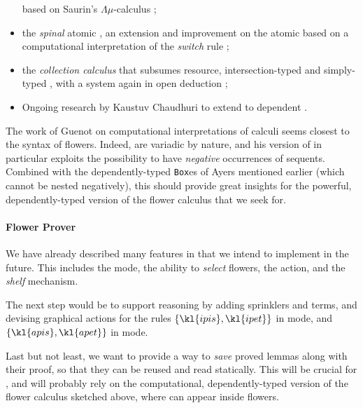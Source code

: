 \begin{scope}
\begin{itemize}
   based on Saurin's $\Lambda\mu$-calculus
  ;
  \item the \emph{spinal} atomic , an extension and
  improvement on the atomic  based on a computational
  interpretation of the \emph{switch} rule ;
  \item the \emph{collection calculus} that subsumes resource,
  intersection-typed and simply-typed , with a  system
  again in open deduction ;
  \item Ongoing research by Kaustuv Chaudhuri to extend  to
  dependent .
\end{itemize}
The work of Guenot on computational interpretations of  calculi
seems closest to the syntax of flowers. Indeed,  are variadic by
nature, and his version of  in particular exploits the
possibility to have \emph{negative} occurrences of sequents. Combined with the
dependently-typed \texttt{Box}es of Ayers mentioned earlier (which cannot be
nested negatively), this should provide great insights for the powerful,
dependently-typed version of the flower calculus that we seek for.

\paragraph{Flower Prover}

We have already described many features in  that we
intend to implement in the future. This includes the \Navigation mode, the
ability to \emph{select} flowers, the  \Proof action, and the
\emph{shelf} mechanism.

The next step would be to support  reasoning by adding sprinklers and
 terms, and devising graphical actions for the rules $\{\kl{ipis},
\kl{ipet}\}$ in \Proof mode, and $\{\kl{apis}, \kl{apet}\}$ in \Edit mode.

Last but not least, we want to provide a way to \emph{save} proved lemmas along
with their proof, so that they can be reused and read statically. This will be
crucial for \emph{}, and will probably rely on the computational,
dependently-typed version of the flower calculus sketched above, where  can appear inside flowers.


\end{scope}
